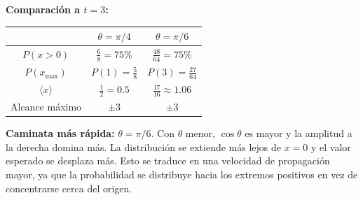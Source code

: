 \textbf{Comparación a $t=3$:}
\begin{center}
    \begin{tabular}{c|c|c}
                            & $\theta = \pi/4$      & $\theta = \pi/6$              \\ \hline
        $P(x>0)$            & $\tfrac{6}{8} = 75\%$ & $\tfrac{48}{64} = 75\%$       \\
        $P(x_{\max})$       & $P(1) = \tfrac{5}{8}$ & $P(3) = \tfrac{27}{64}$       \\
        $\langle x \rangle$ & $\tfrac{1}{2} = 0.5$  & $\tfrac{17}{16} \approx 1.06$ \\
        Alcance máximo      & $\pm 3$               & $\pm 3$
    \end{tabular}
\end{center}

\textbf{Caminata más rápida:} $\theta = \pi/6$. Con $\theta$ menor, $\cos\theta$ es mayor y la amplitud a la derecha domina más. La distribución se extiende más lejos de $x=0$ y el valor esperado se desplaza más. Esto se traduce en una velocidad de propagación mayor, ya que la probabilidad se distribuye hacia los extremos positivos en vez de concentrarse cerca del origen.

\vspace{1cm}
